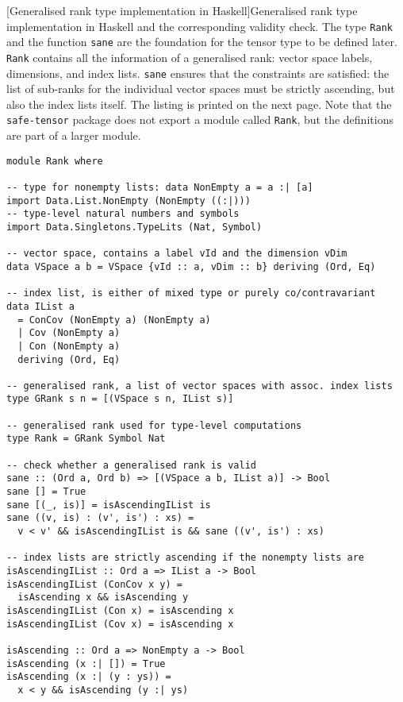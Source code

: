 \begin{code}
  [Generalised rank type implementation in Haskell]{Generalised rank type implementation in Haskell and the corresponding validity check. The type \texttt{Rank} and the function \texttt{sane} are the foundation for the tensor type to be defined later. \texttt{Rank} contains all the information of a generalised rank: vector space labels, dimensions, and index lists. \texttt{sane} ensures that the constraints are satisfied: the list of sub-ranks for the individual vector spaces must be strictly ascending, but also the index lists itself. The listing is printed on the next page. Note that the \texttt{safe-tensor} package \cite{Alex_2020_safe-tensor} does not export a module called \texttt{Rank}, but the definitions are part of a larger module.}
  \label{code_haskell_rank_type}
  \begin{verbatim}
module Rank where

-- type for nonempty lists: data NonEmpty a = a :| [a]
import Data.List.NonEmpty (NonEmpty ((:|)))
-- type-level natural numbers and symbols
import Data.Singletons.TypeLits (Nat, Symbol)

-- vector space, contains a label vId and the dimension vDim
data VSpace a b = VSpace {vId :: a, vDim :: b} deriving (Ord, Eq)

-- index list, is either of mixed type or purely co/contravariant
data IList a
  = ConCov (NonEmpty a) (NonEmpty a)
  | Cov (NonEmpty a)
  | Con (NonEmpty a)
  deriving (Ord, Eq)

-- generalised rank, a list of vector spaces with assoc. index lists
type GRank s n = [(VSpace s n, IList s)]

-- generalised rank used for type-level computations
type Rank = GRank Symbol Nat

-- check whether a generalised rank is valid
sane :: (Ord a, Ord b) => [(VSpace a b, IList a)] -> Bool
sane [] = True
sane [(_, is)] = isAscendingIList is
sane ((v, is) : (v', is') : xs) =
  v < v' && isAscendingIList is && sane ((v', is') : xs)

-- index lists are strictly ascending if the nonempty lists are
isAscendingIList :: Ord a => IList a -> Bool
isAscendingIList (ConCov x y) =
  isAscending x && isAscending y
isAscendingIList (Con x) = isAscending x
isAscendingIList (Cov x) = isAscending x

isAscending :: Ord a => NonEmpty a -> Bool
isAscending (x :| []) = True
isAscending (x :| (y : ys)) =
  x < y && isAscending (y :| ys)
  \end{verbatim}
\end{code}

